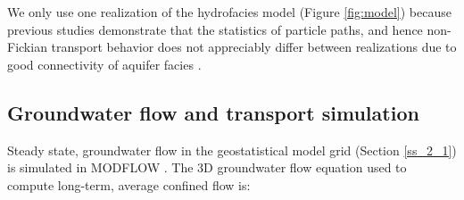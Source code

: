 \bgroup
\begin{table}[ht]
\centering
\caption{Hyrdofacies properties including mean lengths $l$ in $xyz$ directions (strike, dip, and vertical in Figure \ref{fig:model}), hydraulic conductivity $K$ ($m/s$), and average Peclet number across the VHGR scenarios.}
\label{tab:model_l_k_pe}
\end{table}

\egroup

We only use one realization of the hydrofacies model (Figure \ref{fig:model}) because previous studies demonstrate that the statistics of particle paths, and hence non-Fickian transport behavior does not appreciably differ between realizations due to good connectivity of aquifer facies \citep{guo2019upscaling, weissmann2002dispersion}.


%
%
\subsection{Groundwater flow and transport simulation}
\label{ss_2_2}

Steady state, groundwater flow in the geostatistical model grid (Section \ref{ss_2_1}) is simulated in MODFLOW \citep{harbaugh2000modflow, mcdonald1988modflow}. The 3D groundwater flow equation used to compute long-term, average confined flow is:   


